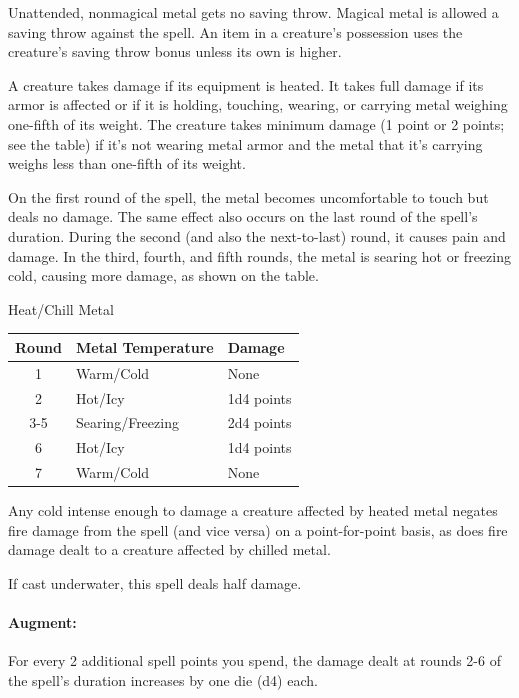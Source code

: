 Unattended, nonmagical metal gets no saving throw. 
Magical metal is allowed a saving throw against the spell. 
An item in a creature's possession uses the creature's saving throw bonus unless its own is higher.

A creature takes damage if its equipment is heated. 
It takes full damage if its armor is affected or if it is holding, touching, wearing, or carrying metal weighing one-fifth of its weight. The creature takes minimum damage (1 point or 2 points; see the table) if it's not wearing metal armor and the metal that it's carrying weighs less than one-fifth of its weight.

On the first round of the spell, the metal becomes uncomfortable to touch but deals no damage. The same effect also occurs on the last round of the spell's duration. During the second (and also the next-to-last) round, it causes pain and damage. In the third, fourth, and fifth rounds, the metal is searing hot or freezing cold, causing more damage, as shown on the table.

\begin{tableonecolumn}
\label{tab:HeatChillMetal}
\caption{Heat/Chill Metal}

\begin{tabular}{|c|l|l|}
\hline
Round&Metal Temperature&Damage\\
\hline
1&Warm/Cold&None\\
2&Hot/Icy&1d4 points\\
3-5&Searing/Freezing&2d4 points\\
6&Hot/Icy&1d4 points\\
7&Warm/Cold&None\\
\hline
\end{tabular}

\end{tableonecolumn}

Any cold intense enough to damage a creature affected by heated metal negates fire damage from the spell (and vice versa) on a point-for-point basis, as does fire damage dealt to a creature affected by chilled metal.

If cast underwater, this spell deals half damage.

\paragraph{Augment:} For every 2 additional spell points you spend, the damage dealt at rounds 2-6 of the spell's duration increases by one die (d4) each.

